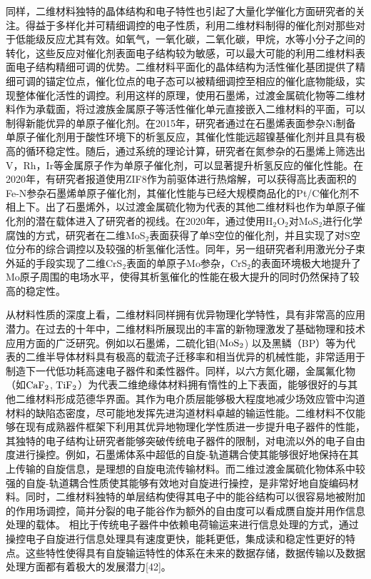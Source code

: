     同样，二维材料独特的晶体结构和电子特性也引起了大量化学催化方面研究者的关注。得益于多样化并可精细调控的电子性质，利用二维材料制得的催化剂对那些对于低能级反应尤其有效。如氧气，一氧化碳，二氧化碳，甲烷，水等小分子之间的转化，这些反应对催化剂表面电子结构较为敏感，可以最大可能的利用二维材料表面电子结构精细可调的优势。二维材料平面化的晶体结构为活性催化基团提供了精细可调的锚定位点，催化位点的电子态可以被精细调控至相应的催化底物能级，实现整体催化活性的调控。利用这样的原理，使用石墨烯，过渡金属硫化物等二维材料作为承载面，将过渡族金属原子等活性催化单元直接嵌入二维材料的平面，可以制得新能优异的单原子催化剂。在2015年，研究者通过在石墨烯表面参杂Ni制备单原子催化剂用于酸性环境下的析氢反应，其催化性能远超镍基催化剂并且具有极高的循环稳定性。随后，通过系统的理论计算，研究者在氮参杂的石墨烯上筛选出V，Rh，Ir等金属原子作为单原子催化剂，可以显著提升析氢反应的催化性能。在2020年，有研究者报道使用ZIF8作为前驱体进行热熔解，可以获得高比表面积的Fe-N参杂石墨烯单原子催化剂，其催化性能与已经大规模商品化的Pt/C催化剂不相上下。出了石墨烯外，以过渡金属硫化物为代表的其他二维材料也作为单原子催化剂的潜在载体进入了研究者的视线。在2020年，通过使用H$_2$O$_2$对MoS$_2$进行化学腐蚀的方式，研究者在二维MoS$_2$表面获得了单S空位的催化剂，并且实现了对S空位分布的综合调控以及较强的析氢催化活性。同年，另一组研究者利用激光分子束外延的手段实现了二维CrS$_2$表面的单原子Mo参杂，CrS$_2$的表面环境极大地提升了Mo原子周围的电场水平，使得其析氢催化的性能在极大提升的同时仍然保持了较高的稳定性。

    从材料性质的深度上看，二维材料同样拥有优异物理化学特性，具有非常高的应用潜力。在过去的十年中，二维材料所展现出的丰富的新物理激发了基础物理和技术应用方面的广泛研究。例如以石墨烯，二硫化钼($\rm{MoS_{2}}$) 以及黑鳞（BP）等为代表的二维半导体材料具有极高的载流子迁移率和相当优异的机械性能，非常适用于制造下一代低功耗高速电子器件和柔性器件。同样，以六方氮化硼，金属氟化物（如$\rm{CaF_{2}}$, $\rm{TiF_{2}}$）为代表二维绝缘体材料拥有惰性的上下表面，能够很好的与其他二维材料形成范德华界面。其作为电介质层能够极大程度地减少场效应管中沟道材料的缺陷态密度，尽可能地发挥先进沟道材料卓越的输运性能。二维材料不仅能够在现有成熟器件框架下利用其优异地物理化学性质进一步提升电子器件的性能，其独特的电子结构让研究者能够突破传统电子器件的限制，对电流以外的电子自由度进行操控。例如，石墨烯体系中超低的自旋-轨道耦合使其能够很好地保持在其上传输的自旋信息，是理想的自旋电流传输材料。而二维过渡金属硫化物体系中较强的自旋-轨道耦合性质使其能够有效地对自旋进行操控，是非常好地自旋编码材料。同时，二维材料独特的单层结构使得其电子中的能谷结构可以很容易地被附加的作用场调控，简并分裂的电子能谷作为额外的自由度可以看成赝自旋并用作信息处理的载体。
    相比于传统电子器件中依赖电荷输运来进行信息处理的方式，通过操控电子自旋进行信息处理具有速度更快，能耗更低，集成读和稳定性更好的特点。这些特性使得具有自旋输运特性的体系在未来的数据存储，数据传输以及数据处理方面都有着极大的发展潜力[42]。%

